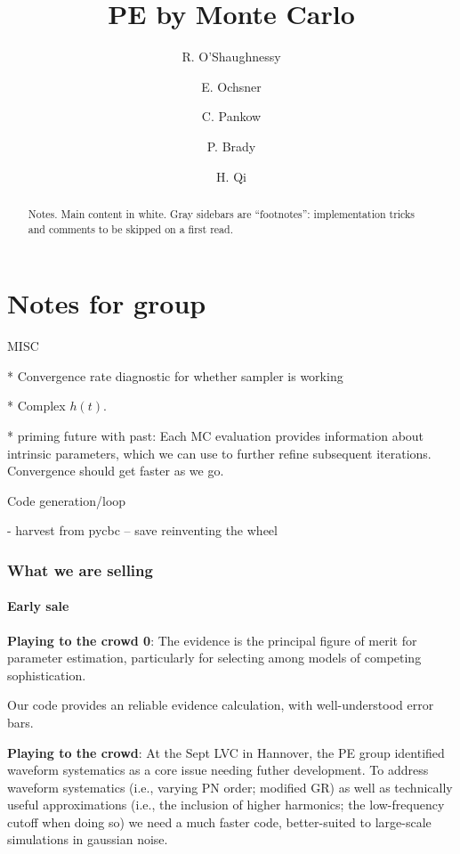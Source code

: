 \documentclass[twocolumn,prd,nofootinbib]{revtex4}
\newcommand\editremark[1]{{\color{red} #1}}
\begin{document}
\title{PE by Monte Carlo}
\author{R. O'Shaughnessy}
\author{E. Ochsner}
\author{C. Pankow}
\author{P. Brady}
\author{H. Qi}
\begin{abstract}
Notes. Main content in white.  Gray sidebars are ``footnotes'': implementation tricks and comments to be skipped on a
first read.
\end{abstract}
\maketitle
\tableofcontents
\part{Notes for group}
\nocite{gwastro-HarryFairhurst-CoherentTargetedSearch}


\editremark{MISC}

* Convergence rate diagnostic for whether sampler is working

* Complex $h(t)$.

* \editremark{priming future with past}: Each MC evaluation provides information about intrinsic parameters, which we can use
to further refine subsequent iterations.  Convergence should get faster as we go.

\editremark{Code generation/loop}

- harvest from pycbc -- save reinventing the wheel

\section{What we are selling}

\subsection{Early sale}

\noindent \textbf{Playing to the crowd 0}: The evidence is the principal figure of merit for parameter estimation,
particularly for selecting among models of competing sophistication.   

Our code provides an  reliable evidence calculation, with well-understood error bars.

\noindent \textbf{Playing to the crowd}: At the Sept LVC in Hannover, the PE group identified waveform systematics as a
core issue needing futher development.  To address waveform systematics (i.e., varying PN order; modified GR) as well as
technically useful approximations (i.e., the inclusion of higher harmonics; the low-frequency cutoff when doing so) we
need a much faster code, better-suited to large-scale simulations in gaussian noise. 
\end{document}
